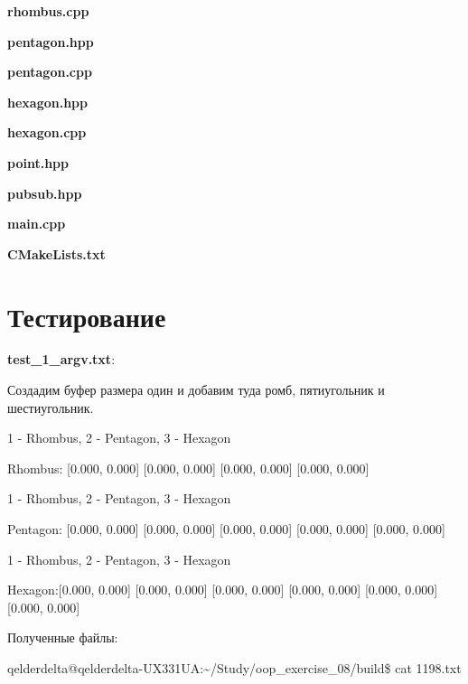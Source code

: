 \documentclass[a4paper, 12pt]{article}
\begin{document}
\vspace{3ex}
\textbf{\large{rhombus.cpp}}


\vspace{3ex}
\textbf{\large{pentagon.hpp}}


\vspace{3ex}
\textbf{\large{pentagon.cpp}}


\vspace{3ex}
\textbf{\large{hexagon.hpp}}


\vspace{3ex}
\textbf{\large{hexagon.cpp}}


\vspace{3ex}
\textbf{\large{point.hpp}}


\vspace{3ex}
\textbf{\large{pubsub.hpp}}


\vspace{3ex}
\textbf{\large{main.cpp}}



\vspace{3ex}
\textbf{\large{CMakeLists.txt}}

\newpage
\section{Тестирование}
\vspace{3ex}

\textbf{test\_1\_argv.txt}:

Создадим буфер размера один и добавим туда ромб, пятиугольник и шестиугольник.

1 - Rhombus, 2 - Pentagon, 3 - Hexagon

Rhombus: [0.000, 0.000] [0.000, 0.000] [0.000, 0.000] [0.000, 0.000] 

1 - Rhombus, 2 - Pentagon, 3 - Hexagon

Pentagon: [0.000, 0.000] [0.000, 0.000] [0.000, 0.000] [0.000, 0.000] [0.000, 0.000] 

1 - Rhombus, 2 - Pentagon, 3 - Hexagon

Hexagon:[0.000, 0.000] [0.000, 0.000] [0.000, 0.000] [0.000, 0.000] [0.000, 0.000] [0.000, 0.000] 

Полученные файлы:

qelderdelta@qelderdelta-UX331UA:\~{}/Study/oop\_exercise\_08/build\$ cat 1198.txt 
\end{document}
